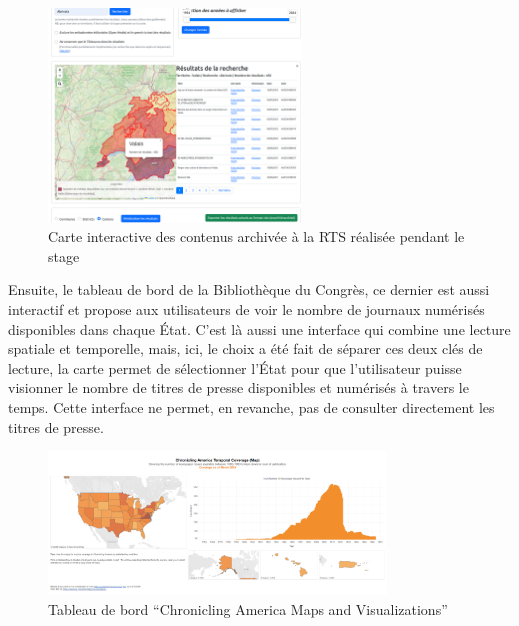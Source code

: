 \begin{figure}[h!]
	\centering
	\includegraphics[width=0.6\textwidth]{images/image14.png}
	\caption{Carte interactive des contenus archivée à la RTS réalisée pendant le stage}
	\label{fig:image14}
\end{figure}


Ensuite, le tableau de bord de la Bibliothèque du Congrès, ce dernier est aussi interactif et propose aux utilisateurs de voir le nombre de journaux numérisés disponibles dans chaque État. C’est là aussi une interface qui combine une lecture spatiale et temporelle, mais, ici, le choix a été fait de séparer ces deux clés de lecture, la carte permet de sélectionner l’État pour que l’utilisateur puisse visionner le nombre de titres de presse disponibles et numérisés à travers le temps. Cette interface ne permet, en revanche, pas de consulter directement les titres de presse.


\begin{figure}[h!]
	\centering
	\includegraphics[width=0.8\textwidth]{images/image15.png}
	\caption{Tableau de bord \enquote{Chronicling America Maps and Visualizations}}
	\label{fig:image15}
\end{figure}


